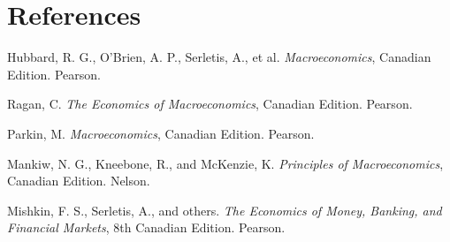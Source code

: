 \documentclass[12pt]{article}
\begin{document}
\section*{References }

Hubbard, R. G., O’Brien, A. P., Serletis, A., et al. \textit{Macroeconomics}, Canadian Edition. Pearson.  

Ragan, C. \textit{The Economics of Macroeconomics}, Canadian Edition. Pearson.  

Parkin, M. \textit{Macroeconomics}, Canadian Edition. Pearson.  

Mankiw, N. G., Kneebone, R., and McKenzie, K. \textit{Principles of Macroeconomics}, Canadian Edition. Nelson.  

Mishkin, F. S., Serletis, A., and others. \textit{The Economics of Money, Banking, and Financial Markets}, 8th Canadian Edition. Pearson.
\end{document}
